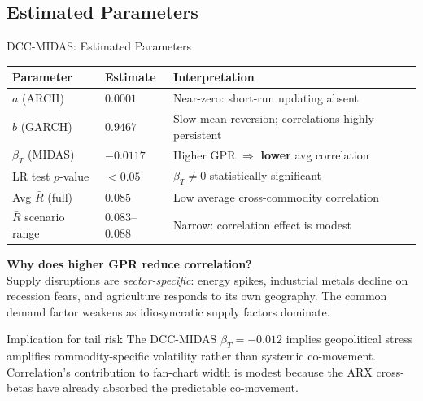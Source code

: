 ﻿\documentclass[aspectratio=1610]{beamer}
\begin{document}
\subsection{Estimated Parameters}

\begin{frame}[shrink=10]{DCC-MIDAS: Estimated Parameters}

  \begin{tabular}{llp{6.5cm}}
    \toprule
    Parameter               & Estimate  & Interpretation \\
    \midrule
    $a$ (ARCH)              & $0.0001$  & Near-zero: short-run updating absent \\
    $b$ (GARCH)             & $0.9467$  & Slow mean-reversion; correlations highly persistent \\
    $\beta_T$ (MIDAS)       & $-0.0117$ & Higher GPR $\Rightarrow$ \textbf{lower} avg correlation \\
    LR test $p$-value       & $< 0.05$  & $\beta_T \neq 0$ statistically significant \\
    Avg $\bar{R}$ (full)    & $0.085$   & Low average cross-commodity correlation \\
    $\bar{R}$ scenario range & $0.083$--$0.088$ & Narrow: correlation effect is modest \\
    \bottomrule
  \end{tabular}

  \smallskip

  \textbf{Why does higher GPR reduce correlation?}\\
  Supply disruptions are \emph{sector-specific}: energy spikes, industrial metals
  decline on recession fears, and agriculture responds to its own geography.
  The common demand factor weakens as idiosyncratic supply factors dominate.

  \begin{alertblock}{Implication for tail risk}
    The DCC-MIDAS $\beta_T = -0.012$ implies geopolitical stress amplifies
    commodity-specific volatility rather than systemic co-movement.
    Correlation's contribution to fan-chart width is modest because the ARX
    cross-betas have already absorbed the predictable co-movement.
  \end{alertblock}

\end{frame}

\end{document}
